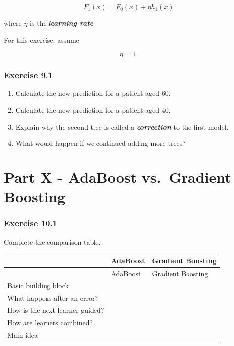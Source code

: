 \documentclass{course_sheet}
\begin{document}
\[
{
F_1(x)=F_0(x)+\eta h_1(x)
}
\]

where $\eta$ is the \textbf{\textit{learning rate}}.

For this exercise, assume

\[
\eta=1.
\]

\subsubsection*{Exercise 9.1}
\begin{enumerate}
\item
Calculate the new prediction for a patient aged 60.

\item
Calculate the new prediction for a patient aged 40.

\item
Explain why the second tree is called a \textbf{\textit{correction}} to the first model.

\item
What would happen if we continued adding more trees?

\end{enumerate}
\clearpage
\section*{Part X - AdaBoost vs. Gradient Boosting}
\subsubsection*{Exercise 10.1}
Complete the comparison table.

\begingroup
\small
\setlength{\tabcolsep}{4pt}
\begin{longtable}{l|l|l}
\rule{0pt}{2.4ex} & AdaBoost & Gradient Boosting \\[3pt]
\hline
\endfirsthead
\rule{0pt}{2.4ex} & AdaBoost & Gradient Boosting \\[3pt]
\hline
\endhead
\rule{0pt}{2.4ex}Basic building block &  $\phantom{-0.00}$ &  $\phantom{-0.00}$ \\[3pt]
\rule{0pt}{2.4ex}What happens after an error? &  $\phantom{-0.00}$ &  $\phantom{-0.00}$ \\[3pt]
\rule{0pt}{2.4ex}How is the next learner guided? &  $\phantom{-0.00}$ &  $\phantom{-0.00}$ \\[3pt]
\rule{0pt}{2.4ex}How are learners combined? &  $\phantom{-0.00}$ &  $\phantom{-0.00}$ \\[3pt]
\rule{0pt}{2.4ex}Main idea &  $\phantom{-0.00}$ &  $\phantom{-0.00}$ \\[3pt]
\end{longtable}
\endgroup
\clearpage
\end{document}
